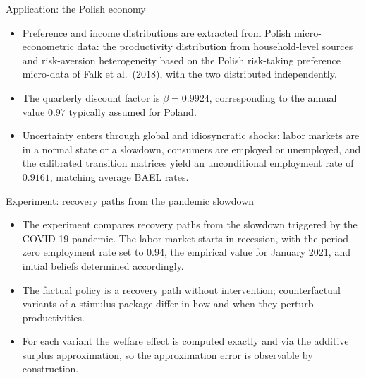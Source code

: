 \documentclass[aspectratio=169,11pt]{beamer}
\begin{document}
\begin{frame}{Application: the Polish economy}
  \begin{itemize}
    \item Preference and income distributions are extracted from Polish
          micro-econometric data: the productivity distribution from
          household-level sources and risk-aversion heterogeneity based on
          the Polish risk-taking preference micro-data of Falk et al.\
          (2018), with the two distributed independently.
    \item The quarterly discount factor is $\beta=0.9924$, corresponding to
          the annual value $0.97$ typically assumed for Poland.
    \item Uncertainty enters through global and idiosyncratic shocks: labor
          markets are in a normal state or a slowdown, consumers are
          employed or unemployed, and the calibrated transition matrices
          yield an unconditional employment rate of $0.9161$, matching
          average BAEL rates.
  \end{itemize}
\end{frame}

\begin{frame}{Experiment: recovery paths from the pandemic slowdown}
  \kicker{Factual vs stimulus variants}
  \begin{itemize}
    \item The experiment compares recovery paths from the slowdown triggered
          by the COVID-19 pandemic. The labor market starts in recession,
          with the period-zero employment rate set to $0.94$, the empirical
          value for January 2021, and initial beliefs determined accordingly.
    \item The factual policy is a recovery path without intervention;
          counterfactual variants of a stimulus package differ in how and
          when they perturb productivities.
    \item For each variant the welfare effect is computed exactly and via
          the additive surplus approximation, so the approximation error is
          observable by construction.
  \end{itemize}
\end{frame}
\end{document}
